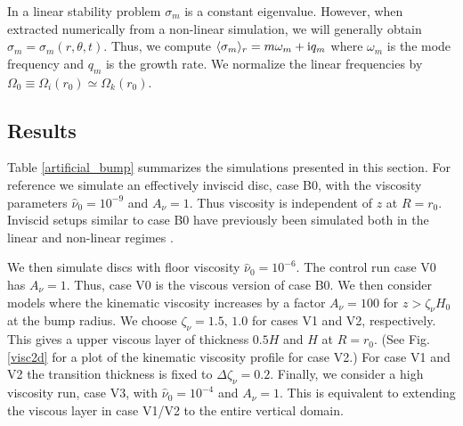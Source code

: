 In a linear stability problem $\sigma_m$ is a constant eigenvalue. 
However, when extracted numerically from a non-linear simulation, 
we will generally obtain $\sigma_m=\sigma_m(r,\theta,t)$. Thus, we compute 
$\langle \sigma_m \rangle_r = m\omega_m + \mathrm{i} q_m$    
where $\omega_m$ is the mode frequency and $q_m$ is the growth rate.
We normalize the linear frequencies by
$\Omega_0\equiv\Omega_i(r_0)\simeq\Omega_k(r_0)$. 

\subsection{Results}
Table \ref{artificial_bump} summarizes the simulations presented in
this section. 
For reference we simulate an effectively inviscid disc, case B0,
with the viscosity parameters $\hat{\nu}_0=10^{-9}$ and $A_\nu = 1$.  
Thus viscosity is independent of $z$ at $R=r_0$.   
Inviscid setups similar to case B0 have previously been simulated
both in the linear and non-linear regimes  \citep{meheut12, lin13}. 

We then simulate discs with floor viscosity  
$\hat{\nu}_0=10^{-6}$. The control run case V0 has $A_\nu =
1$. Thus, case V0 is the viscous version of case B0.  
We then consider models where the kinematic viscosity increases by
a factor $A_\nu=100$ for $z>\zeta_\nu H_0$ at the bump radius. We
choose $\zeta_\nu=1.5,\,1.0$ for cases V1 and V2, respectively.  This
gives a upper 
viscous layer of thickness $0.5H$ and $H$ at $R=r_0$. (See
Fig. \ref{visc2d} for a plot of the kinematic viscosity profile for case V2.) 
For case V1 and V2 the transition thickness is fixed to
$\Delta\zeta_\nu=0.2$. Finally, we consider a high viscosity run, case
V3, with $\hat{\nu}_0=10^{-4}$ and $A_\nu=1$.  This is equivalent to 
extending the viscous layer in case V1/V2 to the entire vertical
domain.  

